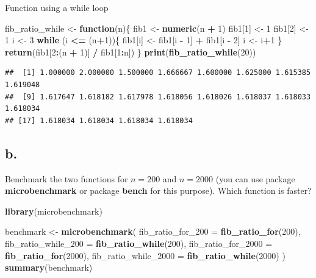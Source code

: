 \documentclass[
]{article}
\newenvironment{Shaded}{\begin{snugshade}}{\end{snugshade}}
\newcommand{\AttributeTok}[1]{\textcolor[rgb]{0.13,0.29,0.53}{#1}}
\newcommand{\ControlFlowTok}[1]{\textcolor[rgb]{0.13,0.29,0.53}{\textbf{#1}}}
\newcommand{\DecValTok}[1]{\textcolor[rgb]{0.00,0.00,0.81}{#1}}
\newcommand{\FunctionTok}[1]{\textcolor[rgb]{0.13,0.29,0.53}{\textbf{#1}}}
\newcommand{\NormalTok}[1]{#1}
\newcommand{\OtherTok}[1]{\textcolor[rgb]{0.56,0.35,0.01}{#1}}
\newcommand{\SpecialCharTok}[1]{\textcolor[rgb]{0.81,0.36,0.00}{\textbf{#1}}}
\begin{document}
Function using a while loop

\begin{Shaded}
\begin{Highlighting}[]
\NormalTok{fib\_ratio\_while }\OtherTok{\textless{}{-}} \ControlFlowTok{function}\NormalTok{(n)\{}
\NormalTok{  fib1 }\OtherTok{\textless{}{-}} \FunctionTok{numeric}\NormalTok{(n }\SpecialCharTok{+} \DecValTok{1}\NormalTok{)}
\NormalTok{  fib1[}\DecValTok{1}\NormalTok{] }\OtherTok{\textless{}{-}} \DecValTok{1}
\NormalTok{  fib1[}\DecValTok{2}\NormalTok{] }\OtherTok{\textless{}{-}} \DecValTok{1}
\NormalTok{  i }\OtherTok{\textless{}{-}} \DecValTok{3}
  \ControlFlowTok{while}\NormalTok{ (i }\SpecialCharTok{\textless{}=}\NormalTok{ (n}\SpecialCharTok{+}\DecValTok{1}\NormalTok{))\{}
\NormalTok{    fib1[i] }\OtherTok{\textless{}{-}}\NormalTok{ fib1[i }\SpecialCharTok{{-}} \DecValTok{1}\NormalTok{] }\SpecialCharTok{+}\NormalTok{ fib1[i }\SpecialCharTok{{-}} \DecValTok{2}\NormalTok{]}
\NormalTok{    i }\OtherTok{\textless{}{-}}\NormalTok{ i}\SpecialCharTok{+}\DecValTok{1}
\NormalTok{  \}}
  \FunctionTok{return}\NormalTok{(fib1[}\DecValTok{2}\SpecialCharTok{:}\NormalTok{(n }\SpecialCharTok{+} \DecValTok{1}\NormalTok{)] }\SpecialCharTok{/}\NormalTok{ fib1[}\DecValTok{1}\SpecialCharTok{:}\NormalTok{n])}
\NormalTok{\}}
\FunctionTok{print}\NormalTok{(}\FunctionTok{fib\_ratio\_while}\NormalTok{(}\DecValTok{20}\NormalTok{))}
\end{Highlighting}
\end{Shaded}

\begin{verbatim}
##  [1] 1.000000 2.000000 1.500000 1.666667 1.600000 1.625000 1.615385 1.619048
##  [9] 1.617647 1.618182 1.617978 1.618056 1.618026 1.618037 1.618033 1.618034
## [17] 1.618034 1.618034 1.618034 1.618034
\end{verbatim}

\subsection{b.}\label{b.}

Benchmark the two functions for \(n=200\) and \(n=2000\) (you can use
package \textbf{microbenchmark} or package \textbf{bench} for this
purpose). Which function is faster?

\begin{Shaded}
\begin{Highlighting}[]
\FunctionTok{library}\NormalTok{(microbenchmark)}

\NormalTok{benchmark }\OtherTok{\textless{}{-}} \FunctionTok{microbenchmark}\NormalTok{(}
  \AttributeTok{fib\_ratio\_for\_200 =} \FunctionTok{fib\_ratio\_for}\NormalTok{(}\DecValTok{200}\NormalTok{),}
  \AttributeTok{fib\_ratio\_while\_200 =} \FunctionTok{fib\_ratio\_while}\NormalTok{(}\DecValTok{200}\NormalTok{),}
  \AttributeTok{fib\_ratio\_for\_2000 =} \FunctionTok{fib\_ratio\_for}\NormalTok{(}\DecValTok{2000}\NormalTok{),}
  \AttributeTok{fib\_ratio\_while\_2000 =} \FunctionTok{fib\_ratio\_while}\NormalTok{(}\DecValTok{2000}\NormalTok{)}
\NormalTok{)}
\FunctionTok{summary}\NormalTok{(benchmark)}
\end{Highlighting}
\end{Shaded}
\end{document}
